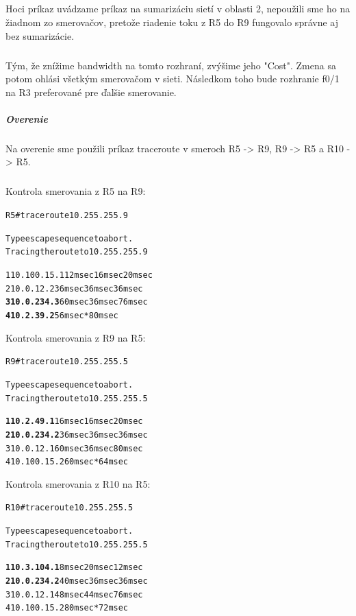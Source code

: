 \documentclass[12pt,twoside,a4paper]{article}
\begin{document}
\subparagraph{}
Hoci príkaz uvádzame príkaz na sumarizáciu sietí v oblasti 2, nepoužili sme ho na žiadnom zo smerovačov, pretože riadenie toku z R5 do R9 fungovalo správne aj bez sumarizácie.

\subparagraph{}
Tým, že znížime bandwidth na tomto rozhraní, zvýšime jeho "Cost". Zmena sa potom ohlási všetkým smerovačom v sieti. Následkom toho bude rozhranie f0/1 na R3 preferované pre ďalšie smerovanie.

\subparagraph{Overenie}
\subparagraph{}
Na overenie sme použili príkaz traceroute v smeroch R5 -\textgreater{} R9, R9 -\textgreater{} R5 a R10 -\textgreater{} R5.
\subparagraph{}

\noindent
Kontrola smerovania  z R5 na R9:
\noindent
{\selectfont
\begin{small}
\begin{alltt}
R5#traceroute 10.255.255.9     

Type escape sequence to abort.
Tracing the route to 10.255.255.9

  1 10.100.15.1 12 msec 16 msec 20 msec
  2 10.0.12.2 36 msec 36 msec 36 msec
  \textbf{3 10.0.234.3} 60 msec 36 msec 76 msec
  \textbf{4 10.2.39.2} 56 msec *  80 msec


\end{alltt}
\end{small}
}

\noindent
Kontrola smerovania  z R9 na R5:
\noindent
{\selectfont
\begin{small}
\begin{alltt}
R9#traceroute 10.255.255.5

Type escape sequence to abort.
Tracing the route to 10.255.255.5

  \textbf{1 10.2.49.1} 16 msec 16 msec 20 msec
  \textbf{2 10.0.234.2} 36 msec 36 msec 36 msec
  3 10.0.12.1 60 msec 36 msec 80 msec
  4 10.100.15.2 60 msec *  64 msec


\end{alltt}
\end{small}
}

\noindent
Kontrola smerovania z R10 na R5:
\noindent
{\selectfont
\begin{small}
\begin{alltt}
R10#traceroute 10.255.255.5

Type escape sequence to abort.
Tracing the route to 10.255.255.5

  \textbf{1 10.3.104.1} 8 msec 20 msec 12 msec
  \textbf{2 10.0.234.2} 40 msec 36 msec 36 msec
  3 10.0.12.1 48 msec 44 msec 76 msec
  4 10.100.15.2 80 msec *  72 msec


\end{alltt}
\end{small}
}
\end{document}
